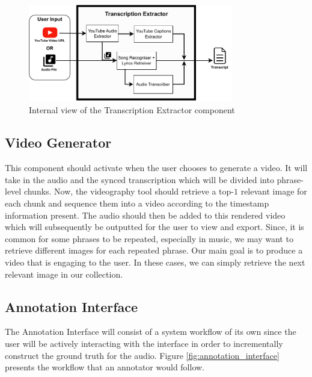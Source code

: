 \documentclass{l4proj}
\begin{document}
\begin{figure}
    \centering
    \includegraphics[width=0.8\textwidth]{figures/transcription_extractor.pdf}
    \caption{Internal view of the Transcription Extractor component}
    \label{fig:transcription_extractor}
\end{figure}

\subsection{Video Generator}
This component should activate when the user chooses to generate a video. It will take in the audio and the synced transcription which will be divided into phrase-level chunks. Now, the videography tool should retrieve a top-$1$ relevant image for each chunk and sequence them into a video according to the timestamp information present. The audio should then be added to this rendered video which will subsequently be outputted for the user to view and export. Since, it is common for some phrases to be repeated, especially in music, we may want to retrieve different images for each repeated phrase. Our main goal is to produce a video that is engaging to the user. In these cases, we can simply retrieve the next relevant image in our collection.

\subsection{Annotation Interface}
The Annotation Interface will consist of a system workflow of its own since the user will be actively interacting with the interface in order to incrementally construct the ground truth for the audio. Figure \ref{fig:annotation_interface} presents the workflow that an annotator would follow.
\end{document}

